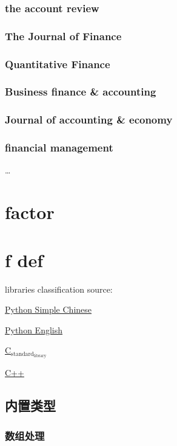 \documentclass[11pt]{article}
\begin{document}
\subsubsection{the account review}
\label{sec:orgheadline65}
\subsubsection{The Journal of Finance}
\label{sec:orgheadline66}
\subsubsection{Quantitative Finance}
\label{sec:orgheadline67}
\subsubsection{Business finance \& accounting}
\label{sec:orgheadline68}
\subsubsection{Journal of accounting \& economy}
\label{sec:orgheadline69}
\subsubsection{financial management}
\label{sec:orgheadline70}
\ldots{}

\section{factor}
\label{sec:orgheadline73}

\section{f def}
\label{sec:orgheadline153}
libraries classification source:

\href{http://usyiyi.cn/translate/python_352/library/index.html}{Python Simple Chinese}

\href{https://docs.python.org/3/library/index.html}{Python English}

\href{https://en.wikipedia.org/wiki/C_standard_library}{C\(_{\text{standard}}_{\text{library}}\)}

\href{http://en.cppreference.com/w/c/links/libs}{C++}
\subsection{内置类型}
\label{sec:orgheadline78}
\subsubsection{数组处理}
\label{sec:orgheadline74}
\end{document}

